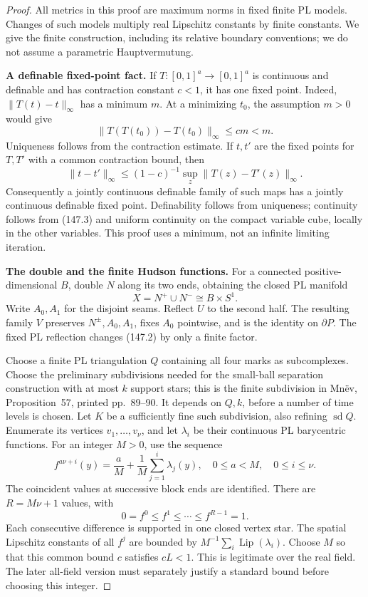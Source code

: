 \begin{proof}
All metrics in this proof are maximum norms in fixed finite PL models.
Changes of such models multiply real Lipschitz constants by finite
constants. We give the finite construction, including its relative
boundary conventions; we do not assume a parametric Hauptvermutung.

\textbf{A definable fixed-point fact.}\quad
If \(T:[0,1]^a\to[0,1]^a\) is continuous and definable and has
contraction constant \(c<1\), it has one fixed point. Indeed,
\(\|T(t)-t\|_\infty\) has a minimum \(m\). At a minimizing \(t_0\),
the assumption \(m>0\) would give
\[
 \|T(T(t_0))-T(t_0)\|_\infty\leq cm<m.
\]
Uniqueness follows from the contraction estimate. If \(t,t'\) are
the fixed points for \(T,T'\) with a common contraction bound, then
\[
 \|t-t'\|_\infty\leq
 (1-c)^{-1}\sup_z\|T(z)-T'(z)\|_\infty.
 \tag{147.3}
\]
Consequently a jointly continuous definable family of such maps has
a jointly continuous definable fixed point. Definability follows from
uniqueness; continuity follows from (147.3) and uniform continuity on
the compact variable cube, locally in the other variables. This proof
uses a minimum, not an infinite limiting iteration.

\textbf{The double and the finite Hudson functions.}\quad
For a connected positive-dimensional \(B\), double \(N\) along its two
ends, obtaining the closed PL manifold
\[
 X=N^+\cup N^-\cong B\times S^1.
\]
Write \(A_0,A_1\) for the disjoint seams. Reflect \(U\) to the second
half. The resulting family \(V\) preserves \(N^\pm,A_0,A_1\), fixes
\(A_0\) pointwise, and is the identity on \(\partial P\).
The fixed PL reflection changes (147.2) by only a finite factor.

Choose a finite PL triangulation \(Q\) containing all four marks as
subcomplexes. Choose the preliminary subdivisions needed for the
small-ball separation construction with at most \(k\) support stars;
this is the finite subdivision in Mn\"ev, Proposition~57,
printed pp.~89--90. It depends on \(Q,k\), before a number of time
levels is chosen. Let \(K\) be a sufficiently fine such subdivision,
also refining \(\operatorname{sd}Q\).
Enumerate its vertices \(v_1,\ldots,v_\nu\), and let \(\lambda_i\)
be their continuous PL barycentric functions.
For an integer \(M>0\), use the sequence
\[
 f^{a\nu+i}(y)=\frac aM+
        \frac1M\sum_{j=1}^{i}\lambda_j(y),
 \quad 0\leq a<M,\quad0\leq i\leq\nu .
 \tag{147.4}
\]
The coincident values at successive block ends are identified.
There are \(R=M\nu+1\) values, with
\[
 0=f^0\leq f^1\leq\cdots\leq f^{R-1}=1.
\]
Each consecutive difference is supported in one closed vertex star.
The spatial Lipschitz constants of all \(f^j\) are bounded by
\(M^{-1}\sum_i\operatorname{Lip}(\lambda_i)\).
Choose \(M\) so that this common bound \(c\) satisfies \(cL<1\).
This is legitimate over the real field. The later all-field version
must separately justify a standard bound before choosing this integer.


\end{proof}
